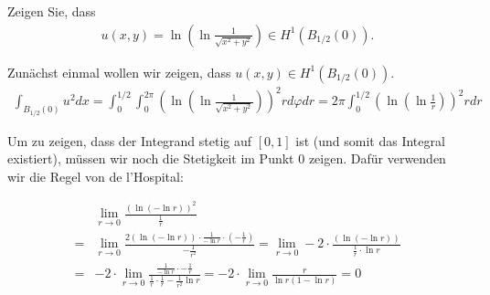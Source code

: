 
\begin{exercise}

  Zeigen Sie, dass
  \begin{align*}
      u(x, y) = \ln\left(\ln \frac{1}{\sqrt{x^2 + y^2}}\right) \in H^1(B_{1/2}(0)).
  \end{align*}

\end{exercise}


\begin{solution}
Zunächst einmal wollen wir zeigen, dass $u(x, y) \in H^1(B_{1/2}(0))$.
\begin{align*}
  \int_{B_{1/2}(0)}u^2 dx = \int_0^{1/2}\int_0^{2\pi}\left(\ln\left(\ln \frac{1}{\sqrt{x^2 + y^2}}\right)\right)^2 r d\varphi dr = 2\pi \int_0^{1/2}\left(\ln\left(\ln \frac{1}{r}\right)\right)^2 r  dr
\end{align*}

Um zu zeigen, dass der Integrand stetig auf $[0,1]$ ist (und somit das Integral existiert), müssen wir noch die Stetigkeit im Punkt $0$ zeigen. Dafür verwenden wir die Regel von de l'Hospital:

\begin{align*}
  & \lim_{r \to 0}\frac{\left(\ln(-\ln r )\right)^2}{\frac{1}{r}} \\
  =& \lim_{r \to 0}\frac{2\left(\ln(-\ln r)\right) \cdot \frac{1}{-\ln r}\cdot (-\frac{1}{r})}{-\frac{1}{r^2}} = \lim_{r \to 0} -2 \cdot \frac{\left(\ln\left(-\ln r \right)\right)}{\frac{1}{r} \cdot \ln r} \\
  =& -2 \cdot \lim_{r \to 0} \frac{\frac{1}{-\ln r} \cdot -\frac{1}{r}}{\frac{1}{r} \cdot \frac{1}{r} - \frac{1}{r^2} \ln r} = -2 \cdot \lim_{r \to 0} \frac{r}{\ln r (1 - \ln r)} = 0
\end{align*}


\end{solution}
